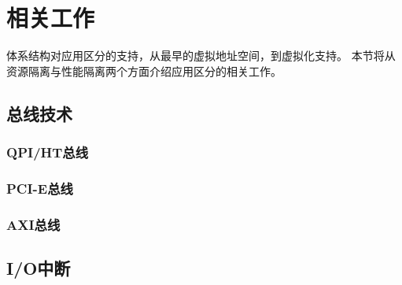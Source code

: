

\section{相关工作}

体系结构对应用区分的支持，从最早的虚拟地址空间，到虚拟化支持。
本节将从资源隔离与性能隔离两个方面介绍应用区分的相关工作。


\subsection{总线技术}

\subsubsection*{QPI/HT总线}

\subsubsection*{PCI-E总线}

\subsubsection*{AXI总线}

\subsection{I/O中断}


